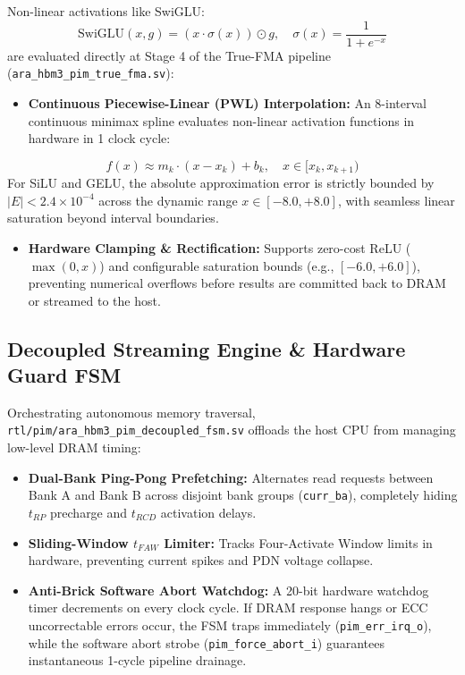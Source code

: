 \documentclass[journal,10pt,twocolumn]{IEEEtran}
\begin{document}
Non-linear activations like SwiGLU:
$$\text{SwiGLU}(x, g) = (x \cdot \sigma(x)) \odot g, \quad \sigma(x) = \frac{1}{1 + e^{-x}}$$
are evaluated directly at Stage 4 of the True-FMA pipeline (\texttt{ara\_hbm3\_pim\_true\_fma.sv}):
\begin{itemize}
  \item \textbf{Continuous Piecewise-Linear (PWL) Interpolation:} An 8-interval continuous minimax spline evaluates non-linear activation functions in hardware in 1 clock cycle:
\end{itemize}
$$f(x) \approx m_k \cdot (x - x_k) + b_k, \quad x \in [x_k, x_{k+1})$$
For SiLU and GELU, the absolute approximation error is strictly bounded by $|E| < 2.4 \times 10^{-4}$ across the dynamic range $x \in [-8.0, +8.0]$, with seamless linear saturation beyond interval boundaries.
\begin{itemize}
  \item \textbf{Hardware Clamping \& Rectification:} Supports zero-cost ReLU ($\max(0, x)$) and configurable saturation bounds (e.g., $[-6.0, +6.0]$), preventing numerical overflows before results are committed back to DRAM or streamed to the host.
\end{itemize}

\subsection{Decoupled Streaming Engine \& Hardware Guard FSM}

Orchestrating autonomous memory traversal, \texttt{rtl/pim/ara\_hbm3\_pim\_decoupled\_fsm.sv} offloads the host CPU from managing low-level DRAM timing:
\begin{itemize}
  \item \textbf{Dual-Bank Ping-Pong Prefetching:} Alternates read requests between Bank A and Bank B across disjoint bank groups (\texttt{curr\_ba}), completely hiding $t_{RP}$ precharge and $t_{RCD}$ activation delays.
  \item \textbf{Sliding-Window $t_{FAW}$ Limiter:} Tracks Four-Activate Window limits in hardware, preventing current spikes and PDN voltage collapse.
  \item \textbf{Anti-Brick Software Abort Watchdog:} A 20-bit hardware watchdog timer decrements on every clock cycle. If DRAM response hangs or ECC uncorrectable errors occur, the FSM traps immediately (\texttt{pim\_err\_irq\_o}), while the software abort strobe (\texttt{pim\_force\_abort\_i}) guarantees instantaneous 1-cycle pipeline drainage.
\end{itemize}
\end{document}
